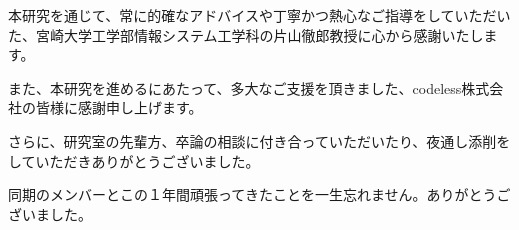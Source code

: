 \acknowledgment
本研究を通じて、常に的確なアドバイスや丁寧かつ熱心なご指導をしていただいた、宮崎大学工学部情報システム工学科の片山徹郎教授に心から感謝いたします。

また、本研究を進めるにあたって、多大なご支援を頂きました、codeless株式会社の皆様に感謝申し上げます。

さらに、研究室の先輩方、卒論の相談に付き合っていただいたり、夜通し添削をしていただきありがとうございました。

同期のメンバーとこの１年間頑張ってきたことを一生忘れません。ありがとうございました。